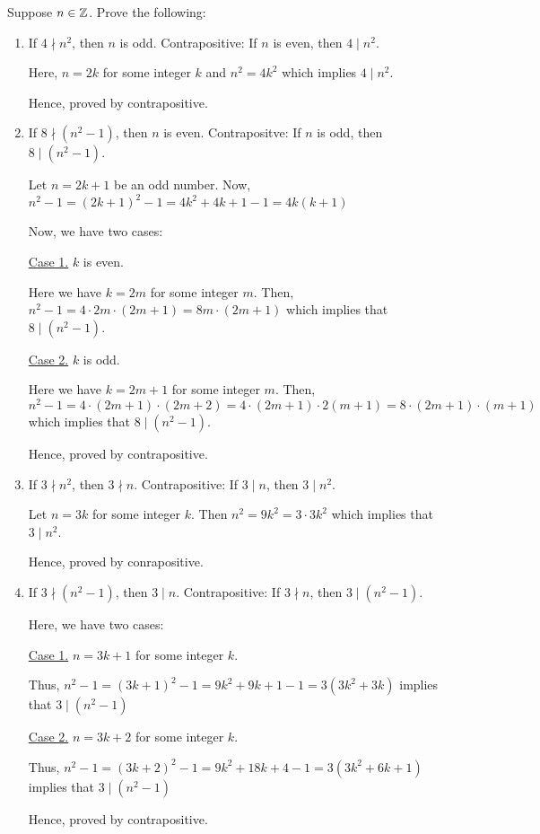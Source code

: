 \bp Suppose $n \in \mathbb{Z}$. Prove the following:
\begin{enumerate}
	\item If $4 \nmid n^2$, then $n$ is odd.
		\bs
		Contrapositive: If $n$ is even, then $4 \mid n^2$.

		Here, $n = 2k$ for some integer $k$ and $n^2 = 4k^2$ which implies $4 \mid n^2$. 

		Hence, proved by contrapositive.
		\es

	\item If $8 \nmid (n^2 - 1)$, then $n$ is even.
		\bs
		Contrapositve: If $n$ is odd, then $8 \mid (n^2 - 1)$.

		Let $n = 2k+1$ be an odd number. 
		Now, $n^2 - 1 = (2k+1)^2 - 1 = 4k^2 + 4k + 1 - 1 = 4k(k+1)$

		Now, we have two cases:

		\underline{Case 1.} $k$ is even.

		Here we have $k = 2m$ for some integer $m$.
		Then, $n^2 - 1 = 4 \cdot 2m \cdot (2m+1) = 8m \cdot (2m+1)$ which implies that $8 \mid (n^2 - 1)$.

		\underline{Case 2.} $k$ is odd.

		Here we have $k = 2m+1$ for some integer $m$.
		Then, $n^2 - 1 = 4 \cdot (2m+1) \cdot (2m+2) = 4 \cdot (2m+1) \cdot 2(m+1) = 8 \cdot (2m+1) \cdot (m+1)$ which implies that $8 \mid (n^2 - 1)$.

		Hence, proved by contrapositive.

		\es

	\item If $3 \nmid n^2$, then $3 \nmid n$.
		\bs
		Contrapositive: If $3 \mid n$, then $3 \mid n^2$.

		Let $n = 3k$ for some integer $k$. Then $n^2 = 9k^2 = 3 \cdot 3k^2$ which implies that $3 \mid n^2$.

		Hence, proved by conrapositive.
		\es

	\item If $3 \nmid (n^2-1)$, then $3 \mid n$.
		\bs
		Contrapositive: If $3 \nmid n$, then $3 \mid (n^2 - 1)$.

		Here, we have two cases:
		
		\underline{Case 1.} $n = 3k+1$ for some integer $k$.

		Thus, $n^2 - 1 = (3k+1)^2 - 1 = 9k^2 + 9k + 1 - 1 = 3(3k^2 + 3k)$ 
		implies that $3 \mid (n^2 - 1)$

		\underline{Case 2.} $n = 3k+2$ for some integer $k$.

		Thus, $n^2 - 1 = (3k+2)^2 - 1 = 9k^2 + 18k + 4 - 1 = 3(3k^2 + 6k + 1)$ 
		implies that $3 \mid (n^2 - 1)$

		Hence, proved by contrapositive.
		\es
\end{enumerate}
\ep

